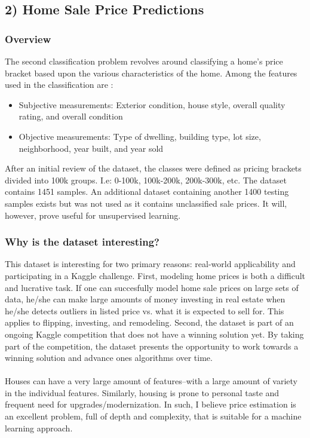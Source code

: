 \documentclass[h]{article}
\begin{document}
\subsection*{2) Home Sale Price Predictions}  
\subsubsection*{Overview}
The second classification problem revolves around classifying a home's price 
bracket based upon the various characteristics of the home.  Among the features 
used in the classification are :
\begin{itemize}
  \item Subjective measurements: Exterior condition, house style, overall quality rating, and overall condition
  \item Objective measurements: Type of dwelling, building type, lot size, neighborhood, year built, and year sold
\end{itemize}
After an initial review of the dataset, the classes were defined as pricing 
brackets divided into 100k groups.  I.e: 0-100k, 100k-200k, 200k-300k, etc.  The 
dataset contains 1451 samples.  An additional dataset containing another 1400 
testing samples exists but was not used as it contains unclassified sale 
prices.  It will, however, prove useful for unsupervised learning. \subsubsection*{Why is the dataset interesting?}
This dataset is interesting for two primary reasons: real-world applicability 
and participating in a Kaggle challenge.  First, modeling home prices is both a 
difficult and lucrative task.  If one can succesfully model home sale prices on 
large sets of data, he/she can make large amounts of money investing in real 
estate when he/she detects outliers in listed price vs. what it is expected to sell for.  
This applies to flipping, investing, and remodeling.  Second, the dataset is 
part of an ongoing Kaggle competition that does not have a winning solution yet. 
 By taking part of the competition, the dataset presents the opportunity to work 
 towards a winning solution and advance ones algorithms over time. 
 \\ \\
 Houses can have a very large amount of features--with a large amount of variety 
 in the individual features.  Similarly, housing is prone to personal taste and 
 frequent need for upgrades/modernization.  In such, I believe price estimation is an 
 excellent problem, full of depth and complexity, that is suitable for a machine 
 learning approach.
 
\end{document}
